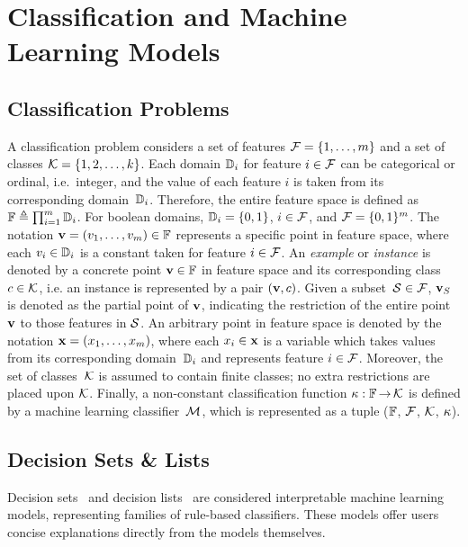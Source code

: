 \section{Classification and Machine Learning Models} \label{sec:ml}

\subsection{Classification Problems}
A classification problem considers a set of features ${\mathcal{F}}=\{1, \ldots, m\}$
and a set of classes ${\mathcal{K}} = \{1, 2, \ldots, k\}$. 
Each domain $\mathbb{D}_i$ for feature $i \in {\mathcal{F}}$ can be 
categorical or ordinal, i.e.\ integer, and the value of each 
feature $i$ is taken from its corresponding domain~$\mathbb{D}_i$.
%
Therefore, the entire feature space is defined as
$\mathbb{F}\triangleq\prod_{i=1}^{m}\mathbb{D}_i$.
%
For boolean domains, $\mathbb{D}_i = \{0, 1\}$, 
$i \in {\mathcal{F}}$, and ${\mathcal{F}} = \{0, 1\}^m$.
%
The notation $\mathbf{v}=(v_1,\ldots,v_m)\in\mathbb{F}$ represents
a specific point in feature space, where each $v_i \in
\mathbb{D}_i$ is a constant taken for feature $i\in{\mathcal{F}}$.
%
An \emph{example} or \emph{instance} is denoted by a concrete point
$\mathbf{v} \in\mathbb{F}$ in feature space and its corresponding class $c
\in {\mathcal{K}}$, i.e. an instance is represented by a pair $(\mathbf{v}, c)$.
%
Given a subset~${\mathcal{S}} \in {\mathcal{F}}$, $\mathbf{v}_S$ is denoted as the 
partial point of $\mathbf{v}$, indicating the restriction of the entire 
point $\mathbf{v}$ to those features in ${\mathcal{S}}$. 
%
An arbitrary point in feature space is denoted by 
the notation $\mathbf{x} = (x_1,\ldots,x_m)$, where each $x_i \in \mathbf{x}$ 
is a variable which takes values from its corresponding domain~$\mathbb{D}_i$ 
and represents feature $i\in{\mathcal{F}}$.
%
Moreover, the set of classes~${\mathcal{K}}$ is assumed to contain 
finite classes; no extra restrictions are placed upon ${\mathcal{K}}$.
%
Finally, a non-constant classification function $\kappa:
\mathbb{F} \operatorname*{\rightarrow} {\mathcal{K}}$ is defined by a machine learning classifier~${\mathcal{M}}$,
which is represented as a tuple ($\mathbb{F}$, ${\mathcal{F}}$, ${\mathcal{K}}$, $\kappa$).

\subsection{Decision Sets \& Lists}
Decision sets~\cite{leskovec-kdd16,michalski-isip69,ipnms-ijcar18,yilbs-cp20} 
and decision lists~\cite{rudin-mpc18,rivest-ml87} are considered interpretable
machine learning models, representing families of rule-based classifiers.
%
These models offer users concise explanations directly from the models themselves.

